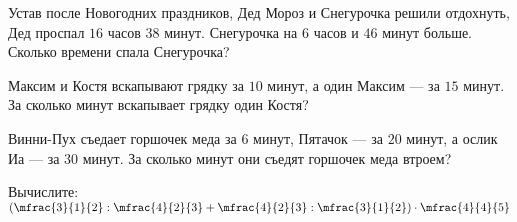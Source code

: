 
\begin{homework}[number=1]
	\begin{listofex}
		\item Устав после Новогодних праздников, Дед Мороз и Снегурочка решили отдохнуть, Дед проспал \( 16 \) часов \( 38 \) минут. Снегурочка на \( 6 \) часов и \( 46 \) минут больше. Сколько времени спала Снегурочка?
		\item Максим и Костя вскапывают грядку за \( 10 \) минут, а один Максим --- за \( 15 \) минут. За сколько минут	вскапывает грядку один Костя?
		\item Винни-Пух съедает горшочек меда за \( 6 \) минут, Пятачок --- за \( 20 \) минут, а ослик Иа --- за \( 30 \) минут. За сколько минут они съедят горшочек меда втроем?
		\item Вычислите: \quad \( \left( \mfrac{3}{1}{2}:\mfrac{4}{2}{3}+\mfrac{4}{2}{3}:\mfrac{3}{1}{2} \right)\cdot\mfrac{4}{4}{5} \)
	\end{listofex}
\end{homework}

